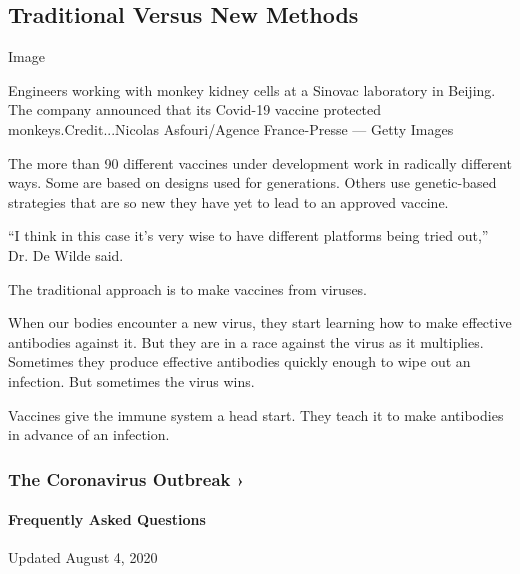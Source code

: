 \hypertarget{traditional-versus-new-methods}{%
\subsection{Traditional Versus New
Methods}\label{traditional-versus-new-methods}}

Image

Engineers working with monkey kidney cells at a Sinovac laboratory in
Beijing. The company announced that its Covid-19 vaccine protected
monkeys.Credit...Nicolas Asfouri/Agence France-Presse --- Getty Images

The more than 90 different vaccines under development work in radically
different ways. Some are based on designs used for generations. Others
use genetic-based strategies that are so new they have yet to lead to an
approved vaccine.

``I think in this case it's very wise to have different platforms being
tried out,'' Dr. De Wilde said.

The traditional approach is to make vaccines from viruses.

When our bodies encounter a new virus, they start learning how to make
effective antibodies against it. But they are in a race against the
virus as it multiplies. Sometimes they produce effective antibodies
quickly enough to wipe out an infection. But sometimes the virus wins.

Vaccines give the immune system a head start. They teach it to make
antibodies in advance of an infection.

\href{https://www.nytimes.com/news-event/coronavirus?action=click\&pgtype=Article\&state=default\&region=MAIN_CONTENT_3\&context=storylines_faq}{}

\hypertarget{the-coronavirus-outbreak-}{%
\subsubsection{The Coronavirus Outbreak
›}\label{the-coronavirus-outbreak-}}

\hypertarget{frequently-asked-questions}{%
\paragraph{Frequently Asked
Questions}\label{frequently-asked-questions}}

Updated August 4, 2020

